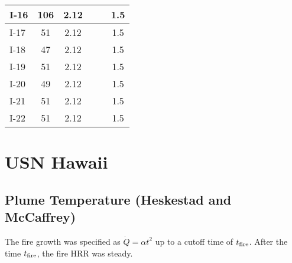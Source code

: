 \begin{table}[!ht]
\begin{center}
\begin{tabular}{|l|c|c||l|c|c|}
I-16       &  106                &  2.12      &            &                     &  1.5       \\ \hline
I-17       &  51                 &  2.12      &            &                     &  1.5       \\ \hline
I-18       &  47                 &  2.12      &            &                     &  1.5       \\ \hline
I-19       &  51                 &  2.12      &            &                     &  1.5       \\ \hline
I-20       &  49                 &  2.12      &            &                     &  1.5       \\ \hline
I-21       &  51                 &  2.12      &            &                     &  1.5       \\ \hline
I-22       &  51                 &  2.12      &            &                     &  1.5       \\ \hline
\end{tabular}
\end{center}
\end{table}


\clearpage


\section{USN Hawaii}

\subsection*{Plume Temperature (Heskestad and McCaffrey)}

The fire growth was specified as $\dot Q = \alpha t^2$ up to a cutoff time of $t\sb{fire}$.
After the time $t\sb{fire}$, the fire HRR was steady.

